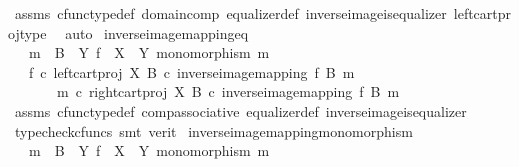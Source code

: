 \begin{isabellebody}
\ assms\ cfunc{\isacharunderscore}{\kern0pt}type{\isacharunderscore}{\kern0pt}def\ domain{\isacharunderscore}{\kern0pt}comp\ equalizer{\isacharunderscore}{\kern0pt}def\ inverse{\isacharunderscore}{\kern0pt}image{\isacharunderscore}{\kern0pt}is{\isacharunderscore}{\kern0pt}equalizer{}\ left{\isacharunderscore}{\kern0pt}cart{\isacharunderscore}{\kern0pt}proj{\isacharunderscore}{\kern0pt}type\ \isamarkupfalse%
\ auto%
\endisatagproof
{\isafoldproof}%
%
\isadelimproof
\isanewline
%
\endisadelimproof
\isanewline
{}\isamarkupfalse%
\ inverse{\isacharunderscore}{\kern0pt}image{\isacharunderscore}{\kern0pt}mapping{\isacharunderscore}{\kern0pt}eq{\isacharcolon}{\kern0pt}\isanewline
\ \ \ {\isachardoublequoteopen}m\ {\isacharcolon}{\kern0pt}\ B\ {\isasymrightarrow}\ Y{\isachardoublequoteclose}\ {\isachardoublequoteopen}f\ {\isacharcolon}{\kern0pt}\ X\ {\isasymrightarrow}\ Y{\isachardoublequoteclose}\ {\isachardoublequoteopen}monomorphism\ m{\isachardoublequoteclose}\isanewline
\ \ \ {\isachardoublequoteopen}f\ {\isasymcirc}\isactrlsub c\ left{\isacharunderscore}{\kern0pt}cart{\isacharunderscore}{\kern0pt}proj\ X\ B\ {\isasymcirc}\isactrlsub c\ inverse{\isacharunderscore}{\kern0pt}image{\isacharunderscore}{\kern0pt}mapping\ f\ B\ m\isanewline
\ \ \ \ \ \ {\isacharequal}{\kern0pt}\ m\ {\isasymcirc}\isactrlsub c\ right{\isacharunderscore}{\kern0pt}cart{\isacharunderscore}{\kern0pt}proj\ X\ B\ {\isasymcirc}\isactrlsub c\ inverse{\isacharunderscore}{\kern0pt}image{\isacharunderscore}{\kern0pt}mapping\ f\ B\ m{\isachardoublequoteclose}\isanewline
%
\isadelimproof
\ \ %
\endisadelimproof
%
\isatagproof
{}\isamarkupfalse%
\ assms\ cfunc{\isacharunderscore}{\kern0pt}type{\isacharunderscore}{\kern0pt}def\ comp{\isacharunderscore}{\kern0pt}associative\ equalizer{\isacharunderscore}{\kern0pt}def\ inverse{\isacharunderscore}{\kern0pt}image{\isacharunderscore}{\kern0pt}is{\isacharunderscore}{\kern0pt}equalizer{}\isanewline
\ \ \isamarkupfalse%
\ {\isacharparenleft}{\kern0pt}typecheck{\isacharunderscore}{\kern0pt}cfuncs{\isacharcomma}{\kern0pt}\ smt\ {\isacharparenleft}{\kern0pt}verit{\isacharparenright}{\kern0pt}{\isacharparenright}{\kern0pt}%
\endisatagproof
{\isafoldproof}%
%
\isadelimproof
\isanewline
%
\endisadelimproof
\isanewline
{}\isamarkupfalse%
\ inverse{\isacharunderscore}{\kern0pt}image{\isacharunderscore}{\kern0pt}mapping{\isacharunderscore}{\kern0pt}monomorphism{\isacharcolon}{\kern0pt}\isanewline
\ \ \ {\isachardoublequoteopen}m\ {\isacharcolon}{\kern0pt}\ B\ {\isasymrightarrow}\ Y{\isachardoublequoteclose}\ {\isachardoublequoteopen}f\ {\isacharcolon}{\kern0pt}\ X\ {\isasymrightarrow}\ Y{\isachardoublequoteclose}\ {\isachardoublequoteopen}monomorphism\ m{\isachardoublequoteclose}\isanewline

\end{isabellebody}

